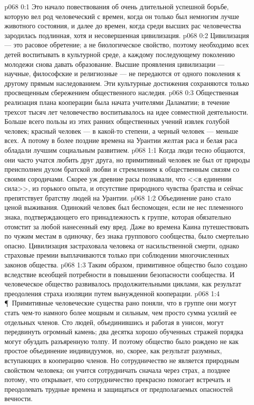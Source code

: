 \vs p068 0:1 Это начало повествования об очень длительной успешной борьбе, которую вел род человеческий с времен, когда он только был немногим лучше животного состояния, и далее до времен, когда среди высших рас человечества зародилась подлинная, хотя и несовершенная цивилизация.
\vs p068 0:2 Цивилизация --- это расовое обретение; а не биологическое свойство, поэтому необходимо всех детей воспитывать в культурной среде, а каждому последующему поколению молодежи снова давать образование. Высшие проявления цивилизации --- научные, философские и религиозные --- не передаются от одного поколения к другому прямым наследованием. Эти культурные достижения сохраняются только просвещенным сбережением общественного наследия.
\vs p068 0:3 Общественная реализация плана кооперации была начата учителями Даламатии; в течение трехсот тысяч лет человечество воспитывалось на идее совместной деятельности. Больше всего пользы из этих ранних общественных учений извлек голубой человек; красный человек --- в какой\hyp{}то степени, а черный человек --- меньше всех. А потому в более поздние времена на Урантии желтая раса и белая раса обладали лучшим социальным развитием.
\vs p068 1:1 Когда люди тесно общаются, они часто учатся любить друг друга, но примитивный человек не был от природы преисполнен духом братской любви и стремлением к общественным связям со своими сородичами. Скорее уж древние расы познавали, что <<в единении сила>>, из горького опыта, и отсутствие природного чувства братства и сейчас препятствует братству людей на Урантии.
\vs p068 1:2 Объединение рано стало ценой выживания. Одинокий человек был беспомощен, если не нес племенного знака, подтверждающего его принадлежность к группе, которая обязательно отомстит за любой нанесенный ему вред. Даже во времена Каина путешествовать по чужим местам в одиночку, без знака группового сообщества, было смертельно опасно. Цивилизация застраховала человека от насильственной смерти, однако страховые премии выплачиваются только при соблюдении многочисленных законов общества.
\vs p068 1:3 Таким образом, примитивное общество было создано вследствие всеобщей потребности в повышении безопасности сообщества. И человеческое общество развивалось продолжительными циклами, как результат преодоления страха изоляции путем вынужденной кооперации.
\vs p068 1:4 \P\ Примитивные человеческие существа рано поняли, что в группе они могут стать чем\hyp{}то намного более мощным и сильным, чем просто сумма усилий ее отдельных членов. Сто людей, объединившись и работая в унисон, могут передвинуть огромный камень; два десятка хорошо обученных стражей порядка могут обуздать разъяренную толпу. И поэтому общество было рождено не как простое объединение индивидуумов, но, скорее, как результат  разумных, вступающих в кооперацию членов. Но сотрудничество не является природным свойством человека; он учится сотрудничать сначала через страх, а позднее потому, что открывает, что сотрудничество прекрасно помогает встречать и преодолевать трудные времена и защищаться от предполагаемых опасностей вечности.

